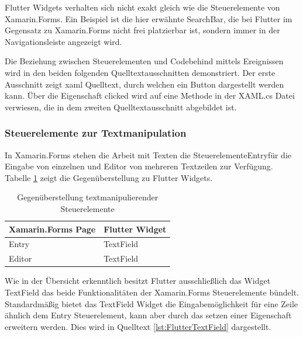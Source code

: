 Flutter Widgets verhalten sich nicht exakt gleich wie die Steuerelemente von Xamarin.Forms.  Ein Beispiel ist die hier erwähnte SearchBar, die bei Flutter im Gegensatz zu Xamarin.Forms nicht frei platzierbar ist, sondern immer in der Navigationsleiste angezeigt wird. 

Die Beziehung zwischen Steuerelementen und Codebehind mittels Ereignissen wird  in den beiden folgenden Quelltextausschnitten demonstriert.  Der erste Ausschnitt zeigt  \ac{xaml} Quelltext,  durch welchen ein Button dargestellt werden kann.  Über die Eigenschaft clicked wird auf eine Methode in der XAML.cs Datei verwiesen,  die in dem zweiten Quelltextausschnitt abgebildet ist. 





\subsubsection{Steuerelemente zur Textmanipulation}
In Xamarin.Forms stehen die Arbeit mit Texten die Steuerelemente\glq Entry\grq{}für die Eingabe von einzelnen und  \glq Editor\grq{} von mehreren Textzeilen zur Verfügung.  Tabelle \ref{tab:TextWidgets} zeigt die Gegenüberstellung zu Flutter Widgets.  

\begin{table}[!ht]
\begin{tabularx}{\textwidth}{X|X}
   \textbf{Xamarin.Forms Page} & \textbf{Flutter Widget}  \\
\hline
	Entry		       		&  TextField	 		\\ 
	Editor		       	&  TextField	 		\\ 
\end{tabularx}
\caption{Gegenüberstellung textmanipulierender Steuerelemente}
 \label{tab:TextWidgets}
\end{table}
Wie in der Übersicht erkenntlich besitzt Flutter ausschließlich das Widget \glq TextField\grq{} das beide Funktionalitäten der Xamarin.Forms Steuerelemente bündelt.  Standardmäßig bietet das \glq TextField\grq{} Widget die Eingabemöglichkeit für eine Zeile ähnlich dem \glq Entry\grq{} Steuerelement, kann aber durch das setzen einer Eigenschaft erweitern werden.  Dies wird in Quelltext \ref{lst:FlutterTextField} dargestellt.

